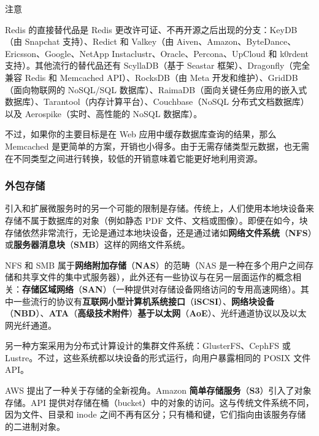 \begin{myNotic}{注意}

Redis 的直接替代品是 Redis 更改许可证、不再开源之后出现的分支：KeyDB（由 Snapchat 支持）、Redict 和 Valkey（由 Aiven、Amazon、ByteDance、Ericsson、Google、NetApp Instaclustr、Oracle、Percona、UpCloud 和 k0rdent 支持）。其他流行的替代品还有 ScyllaDB（基于 Seastar 框架）、Dragonfly（完全兼容 Redis 和 Memcached API）、RocksDB（由 Meta 开发和维护）、GridDB（面向物联网的 NoSQL/SQL 数据库）、RaimaDB（面向关键任务应用的嵌入式数据库）、Tarantool（内存计算平台）、Couchbase（NoSQL 分布式文档数据库）以及 Aerospike（实时、高性能的 NoSQL 数据库）。
\end{myNotic}

不过，如果你的主要目标是在 Web 应用中缓存数据库查询的结果，那么 Memcached 是更简单的方案，开销也小得多。由于无需存储类型元数据，也无需在不同类型之间进行转换，较低的开销意味着它能更好地利用资源。

\subsubsection{外包存储}

\label{idx:1436}
\label{idx:1437}
\label{idx:1438}
引入和扩展微服务时的另一个可能的限制是存储。传统上，人们使用本地块设备来存储不属于数据库的对象（例如静态 PDF 文件、文档或图像）。即便在如今，块存储依然非常流行，无论是通过本地块设备，还是通过诸如\textbf{网络文件系统}（\textbf{NFS}）或\textbf{服务器消息块}（\textbf{SMB}）这样的网络文件系统。

\label{idx:1439}
\label{idx:1440}
\label{idx:1441}
\label{idx:1442}
\label{idx:1443}
NFS 和 SMB 属于\textbf{网络附加存储}（\textbf{NAS}）的范畴（NAS 是一种在多个用户之间存储和共享文件的集中式服务器），此外还有一些协议与在另一层面运作的概念相关：\textbf{存储区域网络}（\textbf{SAN}）（一种提供对存储设备网络访问的专用高速网络）。其中一些流行的协议有\textbf{互联网小型计算机系统接口}（\textbf{iSCSI}）、\textbf{网络块设备}（\textbf{NBD}）、\textbf{ATA}（\textbf{高级技术附件}）\textbf{基于以太网}（\textbf{AoE}）、光纤通道协议以及以太网光纤通道。

另一种方案采用为分布式计算设计的集群文件系统：GlusterFS、CephFS 或 Lustre。不过，这些系统都以块设备的形式运行，向用户暴露相同的 POSIX 文件 API。

\label{idx:1444}
AWS 提出了一种关于存储的全新视角。Amazon \textbf{简单存储服务}（\textbf{S3}）引入了对象存储。API 提供对存储在桶（bucket）中的对象的访问。这与传统文件系统不同，因为文件、目录和 inode 之间不再有区分；只有桶和键，它们指向由该服务存储的二进制对象。

